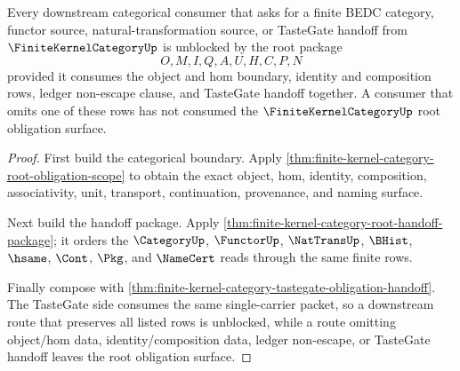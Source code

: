 \begin{theorem}
\label{thm:finite-kernel-category-root-downstream-unblock}
Every downstream categorical consumer that asks for a finite BEDC category, functor source, natural-transformation source, or TasteGate handoff from $\FiniteKernelCategoryUp$ is unblocked by the root package
$$
O,M,I,Q,A,U,H,C,P,N
$$
provided it consumes the object and hom boundary, identity and composition rows, ledger non-escape clause, and TasteGate handoff together. A consumer that omits one of these rows has not consumed the $\FiniteKernelCategoryUp$ root obligation surface.
\end{theorem}
\begin{proof}
First build the categorical boundary. Apply \autoref{thm:finite-kernel-category-root-obligation-scope} to obtain the exact object, hom, identity, composition, associativity, unit, transport, continuation, provenance, and naming surface.

Next build the handoff package. Apply \autoref{thm:finite-kernel-category-root-handoff-package}; it orders the $\CategoryUp$, $\FunctorUp$, $\NatTransUp$, $\BHist$, $\hsame$, $\Cont$, $\Pkg$, and $\NameCert$ reads through the same finite rows.

Finally compose with \autoref{thm:finite-kernel-category-tastegate-obligation-handoff}. The TasteGate side consumes the same single-carrier packet, so a downstream route that preserves all listed rows is unblocked, while a route omitting object/hom data, identity/composition data, ledger non-escape, or TasteGate handoff leaves the root obligation surface.
\end{proof}

